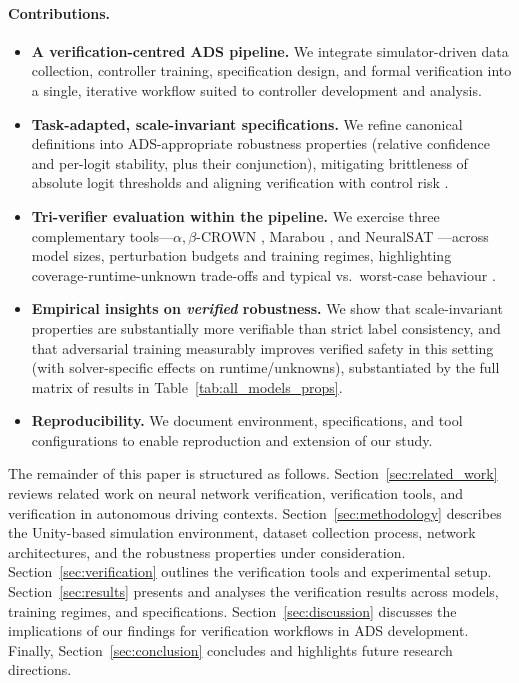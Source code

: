 \paragraph{Contributions.}
\begin{itemize}
  \item \textbf{A verification-centred ADS pipeline.} We integrate simulator-driven data collection, controller training, specification design, and formal verification into a single, iterative workflow suited to controller development and analysis.
  \item \textbf{Task-adapted, scale-invariant specifications.} We refine canonical definitions into ADS-appropriate robustness properties (relative confidence and per-logit stability, plus their conjunction), mitigating brittleness of absolute logit thresholds and aligning verification with control risk \cite{casadio2022neural}.
  \item \textbf{Tri-verifier evaluation within the pipeline.} We exercise three complementary tools—$\alpha,\beta$-CROWN \cite{zhang2018efficient,xu2021fast,wang2021beta,zhou2024scalable}, Marabou \cite{katz2019marabou}, and NeuralSAT \cite{duong2024dpllt}—across model sizes, perturbation budgets and training regimes, highlighting coverage-runtime-unknown trade-offs and typical vs.\ worst-case behaviour \cite{bak2021second,brix2023fourth,brix2024fifth,shriver2021dnnv}.
  \item \textbf{Empirical insights on \emph{verified} robustness.} We show that scale-invariant properties are substantially more verifiable than strict label consistency, and that adversarial training measurably improves verified safety in this setting (with solver-specific effects on runtime/unknowns), substantiated by the full matrix of results in Table~\ref{tab:all_models_props}.
  \item \textbf{Reproducibility.} We document environment, specifications, and tool configurations to enable reproduction and extension of our study.
\end{itemize}

The remainder of this paper is structured as follows. 
Section~\ref{sec:related_work} reviews related work on neural network verification, verification tools, and verification in autonomous driving contexts. 
Section~\ref{sec:methodology} describes the Unity-based simulation environment, dataset collection process, network architectures, and the robustness properties under consideration. 
Section~\ref{sec:verification} outlines the verification tools and experimental setup. 
Section~\ref{sec:results} presents and analyses the verification results across models, training regimes, and specifications. 
Section~\ref{sec:discussion} discusses the implications of our findings for verification workflows in ADS development. 
Finally, Section~\ref{sec:conclusion} concludes and highlights future research directions.
